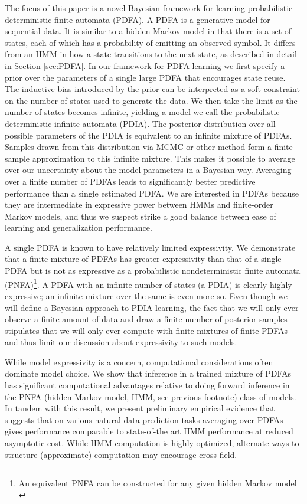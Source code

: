 The focus of this paper is a novel Bayesian framework for learning probabilistic deterministic finite automata (PDFA).  A PDFA is a generative model for sequential data.  It is similar to a hidden Markov model in that there is a set of states, each of which has a probability of emitting an observed symbol.  It differs from an HMM in how a state transitions to the next state, as described in detail in Section \ref{sec:PDFA}.  In our framework for PDFA learning we first specify a prior over the parameters of a single large PDFA that encourages state reuse.  The inductive bias introduced by the prior can be interpreted as a soft constraint on the number of states used to generate the data.  We then take the limit as the number of states becomes infinite, yielding a model we call the probabilistic deterministic infinite automata (PDIA).  The posterior distribution over all possible parameters of the PDIA is equivalent to an infinite mixture of PDFAs.  Samples drawn from this distribution via MCMC or other method form a finite sample approximation to this infinite mixture.  This makes it possible to average over our uncertainty about the model parameters in a Bayesian way.  Averaging over a finite number of PDFAs leads to significantly better predictive performance than a single estimated PDFA.  We are interested in PDFAs because they are intermediate in expressive power between HMMs and finite-order Markov models, and thus we suspect strike a good balance between ease of learning and generalization performance.

A single PDFA is known to have relatively limited expressivity.  We demonstrate that a finite mixture of PDFAs has greater expressivity than that of a single PDFA but is not as expressive as a probabilistic nondeterministic finite automata (PNFA)\footnote{An equivalent PNFA can be constructed for any given hidden Markov model \cite{Dupont2005} }.  A PDFA with an infinite number of states (a PDIA) is clearly highly expressive; an infinite mixture over the same is even more so.  Even though we will define a Bayesian approach to PDIA learning, the fact that we will only ever observe a finite amount of data and draw a finite number of posterior samples stipulates that we will only ever compute with finite mixtures of finite PDFAs and thus limit our discussion about expressivity to such models.   

While model expressivity is a concern, computational considerations often dominate model choice.  We show that inference in a trained mixture of PDFAs has significant computational advantages relative to doing forward inference in the PNFA (hidden Markov model, HMM, see previous footnote) class of models.   In tandem with this result, we present preliminary empirical evidence that suggests that on various natural data prediction tasks averaging over PDFAs gives performance comparable to state-of-the art HMM performance at reduced asymptotic cost.  While HMM computation is highly optimized, alternate ways to structure (approximate) computation may encourage cross-field.

